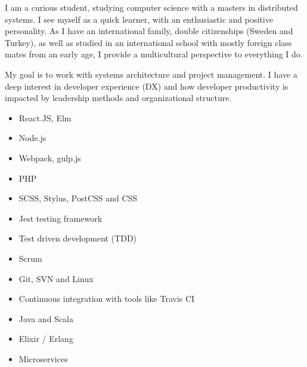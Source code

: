 I am a curious student, studying computer science with a masters in distributed systems. 
I see myself as a quick learner, with an enthusiastic and positive personality. As I have an international family, double citizenships (Sweden and Turkey), as well as studied in an international school with mostly foreign class mates from an early age, I provide a multicultural perspective to everything I do.

My goal is to work with systems architecture and project management. I have a deep interest in developer experience (DX) and how developer productivity is impacted by leadership methods and organizational structure.



\divider




\begin{itemize}
    \item React.JS, Elm
    \item Node.js
    \item Webpack, gulp.js
    \item PHP
    \item SCSS, Stylus, PostCSS and CSS
    \item Jest testing framework
\end{itemize}


\divider

\begin{itemize}
    \item Test driven development (TDD)
    \item Scrum
    \item Git, SVN and Linux
    \item Continuous integration with tools like Travis CI
    \item Java and Scala
    \item Elixir / Erlang
    \item Microservices
\end{itemize}





